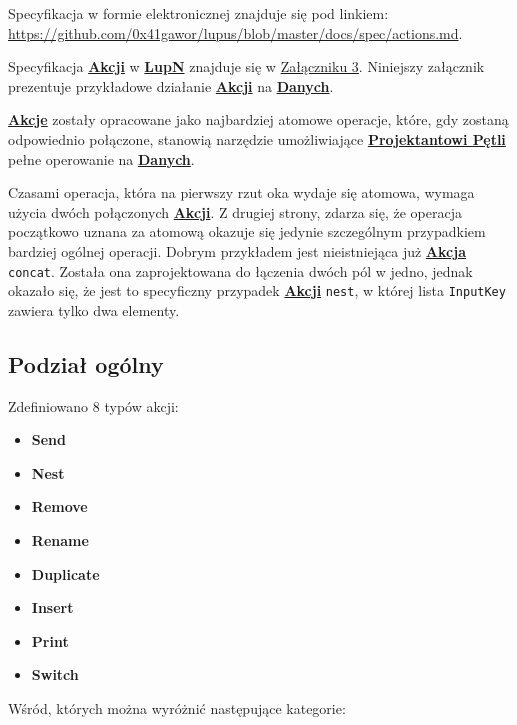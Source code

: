 \label{appendix:6}

Specyfikacja w formie elektronicznej znajduje się pod linkiem: \url{https://github.com/0x41gawor/lupus/blob/master/docs/spec/actions.md}.

Specyfikacja \hyperlink{def:akcja}{\textbf{Akcji}} w \hyperlink{def:lupn}{\textbf{LupN}} znajduje się w \hyperref[appendix:3]{Załączniku 3}. Niniejszy załącznik prezentuje przykładowe działanie \hyperlink{def:akcja}{\textbf{Akcji}} na \hyperlink{def:dane}{\textbf{Danych}}.

\hyperlink{def:akcja}{\textbf{Akcje}} zostały opracowane jako najbardziej atomowe operacje, które, gdy zostaną odpowiednio połączone, stanowią narzędzie umożliwiające \hyperlink{def:projektant}{\textbf{Projektantowi Pętli}} pełne operowanie na \hyperlink{def:dane}{\textbf{Danych}}.

Czasami operacja, która na pierwszy rzut oka wydaje się atomowa, wymaga użycia dwóch połączonych \hyperlink{def:akcja}{\textbf{Akcji}}. Z drugiej strony, zdarza się, że operacja początkowo uznana za atomową okazuje się jedynie szczególnym przypadkiem bardziej ogólnej operacji. Dobrym przykładem jest nieistniejąca już \hyperlink{def:akcja}{\textbf{Akcja}} \texttt{concat}. Została ona zaprojektowana do łączenia dwóch pól w jedno, jednak okazało się, że jest to specyficzny przypadek \hyperlink{def:akcja}{\textbf{Akcji}} \texttt{nest}, w której lista \texttt{InputKey} zawiera tylko dwa elementy.

\subsection{Podział ogólny}

Zdefiniowano 8 typów akcji:

\begin{itemize}
    \item \textbf{Send}
    \item \textbf{Nest}
    \item \textbf{Remove}
    \item \textbf{Rename}
    \item \textbf{Duplicate}
    \item \textbf{Insert}
    \item \textbf{Print}
    \item \textbf{Switch}
\end{itemize}

Wśród, których można wyróżnić następujące kategorie:

